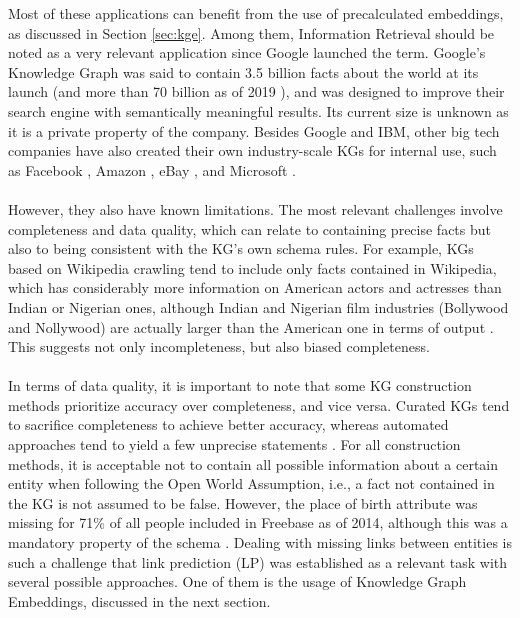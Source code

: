 \documentclass[11pt,titlepage,oneside,openany]{book}
\begin{document}
Most of these applications can benefit from the use of precalculated embeddings, as discussed in Section \ref{sec:kge}. Among them, Information Retrieval should be noted as a very relevant application since Google launched the term. Google's Knowledge Graph \cite{singhal_introducing_2012} was said to contain 3.5 billion facts about the world at its launch (and more than 70 billion as of 2019 \cite{noy_industry-scale_2019}), and was designed to improve their search engine with semantically meaningful results. Its current size is unknown as it is a private property of the company. Besides Google and IBM, other big tech companies have also created their own industry-scale KGs for internal use, such as Facebook \cite{noy_industry-scale_2019}, Amazon \cite{krishnan_making_2018}, eBay \cite{noy_industry-scale_2019}, and Microsoft \cite{shrivastava_bring_2017}.\\
\\
However, they also have known limitations. The most relevant challenges involve completeness and data quality, which can relate to containing precise facts but also to being consistent with the KG's own schema rules. For example, KGs based on Wikipedia crawling tend to include only facts contained in Wikipedia, which has considerably more information on American actors and actresses than Indian or Nigerian ones, although Indian and Nigerian film industries (Bollywood and Nollywood) are actually larger than the American one in terms of output \cite{nickel_review_2016}. This suggests not only incompleteness, but also biased completeness.\\
\\
In terms of data quality, it is important to note that some KG construction methods prioritize accuracy over completeness, and vice versa. Curated KGs tend to sacrifice completeness to achieve better accuracy, whereas automated approaches tend to yield a few unprecise statements \cite{nickel_review_2016}. For all construction methods, it is acceptable not to contain all possible information about a certain entity when following the Open World Assumption, i.e., a fact not contained in the KG is not assumed to be false. However, the place of birth attribute was missing for 71\% of all people included in Freebase as of 2014, although this was a mandatory property of the schema \cite{west_knowledge_2014}. Dealing with missing links between entities is such a challenge that link prediction (LP) was established as a relevant task with several possible approaches. One of them is the usage of Knowledge Graph Embeddings, discussed in the next section.
\end{document}
